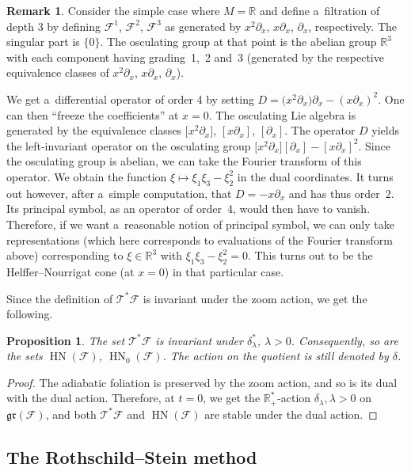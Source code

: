\documentclass[pdftex]{sigma}
\newcommand{\R}{\mathbb R} %
\newcommand{\F}{\mathcal{F}} %
\newcommand{\T}{\mathcal{T}} %
\newcommand{\HN}{\operatorname{HN}} %
\newcommand{\Fb}{\mathcal{F}} %
\newcommand{\gr}{\mathfrak{gr}} %
\numberwithin{equation}{section}
\newtheorem{prop}[thm]{Proposition}
\theoremstyle{definition}
\newtheorem{rem}[thm]{Remark}
\begin{document}
\begin{rem}\label{Remark : One cannot use all the representations}
 Consider the simple case where $M = \R$ and define a~filtration of depth 3 by defining $\F^1$, $\F^2$, $\F^3$ as generated by $x^2\partial_x$, $x\partial_x$, $\partial_x$, respectively. The singular part is $\{0\}$. The osculating group at that point is the abelian group $\R^3$ with each component having grading~1,~2 and~3 (generated by the respective equivalence classes of $x^2\partial_x$, $x\partial_x$, $\partial_x$).

 We get a~differential operator of order 4 by setting $D= \bigl(x^2\partial_x\bigr)\partial_x - (x\partial_x)^2$. One can then ``freeze the coefficients'' at $x = 0$. The osculating Lie algebra is generated by the equivalence classes $\big[x^2\partial_x\big]$, $[x\partial_x]$, $[\partial_x]$. The operator $D$ yields the left-invariant operator on the osculating group $\big[x^2\partial_x\big][\partial_x] - [x\partial_x]^2$. Since the osculating group is abelian, we can take the Fourier transform of this operator. We obtain the function $\xi \mapsto \xi_1\xi_3 - \xi_2^2$ in the dual coordinates. It turns out however, after a~simple computation, that $D = -x\partial_x$ and has thus order~2. Its principal symbol, as an operator of order~4, would then have to vanish. Therefore, if we want a~reasonable notion of principal symbol, we can only take representations (which here corresponds to evaluations of the Fourier transform above) corresponding to $\xi \in \R^3$ with $\xi_1\xi_3 - \xi_2^2 = 0$. This turns out to be the Helffer--Nourrigat cone (at $x=0$) in that particular case.
\end{rem}

Since the definition of $\T^*\F$ is invariant under the zoom action, we get the following.

\begin{prop}
 The set $\T^*\F$ is invariant under $\delta^*_{\lambda}$, $\lambda>0$. Consequently, so are the sets $\HN(\Fb)$, $\HN_0(\Fb)$. The action on the quotient is still denoted by $\delta$.
\end{prop}
\begin{proof}
 The adiabatic foliation is preserved by the zoom action, and so is its dual with the dual action. Therefore, at $t=0$, we get the $\R^*_+$-action $\delta_{\lambda}, \lambda > 0$ on $\gr(\Fb)$, and both $\T^*\F$ and $\HN(\Fb)$ are stable under the dual action.
\end{proof}

\subsection{The Rothschild--Stein method}\label{Subsection:Rothschild--Stein}
\end{document}
